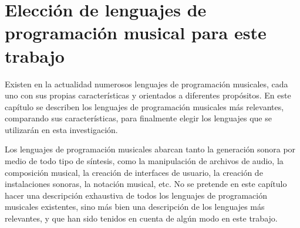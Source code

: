 


\chapter{Elección de lenguajes de programación musical para este trabajo}


Existen en la actualidad numerosos lenguajes de programación musicales, cada uno con sus propias características y orientados a diferentes propósitos. En este capítulo se describen los lenguajes de programación musicales más relevantes, comparando sus características, para finalmente elegir los lenguajes que se utilizarán en esta investigación.

Los lenguajes de programación musicales abarcan tanto la generación sonora por medio de todo tipo de síntesis, como la manipulación de archivos de audio, la composición musical, la creación de interfaces de usuario, la creación de instalaciones sonoras, la notación musical, etc. No se pretende en este capítulo hacer una descripción exhaustiva de todos los lenguajes de programación musicales existentes, sino más bien una descripción de los lenguajes más relevantes, y que han sido tenidos en cuenta de algún modo en este trabajo. 

